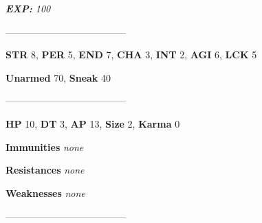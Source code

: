 \documentclass[11pt,a4paper,twocolumn]{book}
\begin{document}
	\emph{\textbf{EXP:} 100}
	
%		
%	
%		

	--------------------------------------

	\noindent
	\textbf{STR} 8, \textbf{PER} 5, \textbf{END} 7, \textbf{CHA} 3, \textbf{INT} 2, \textbf{AGI} 6, \textbf{LCK} 5
	
	\noindent
	\textbf{Unarmed} 70, \textbf{Sneak} 40
	
	--------------------------------------
	
	\noindent
	\textbf{HP} 10, \textbf{DT} 3, \textbf{AP} 13, \textbf{Size} 2, \textbf{Karma} 0
	
	
	\noindent
	\textbf{Immunities} \emph{none} %
	
	\noindent
	\textbf{Resistances} \emph{none} %
	
	\noindent
	\textbf{Weaknesses} \emph{none} %
	
	--------------------------------------
	
\end{document}
